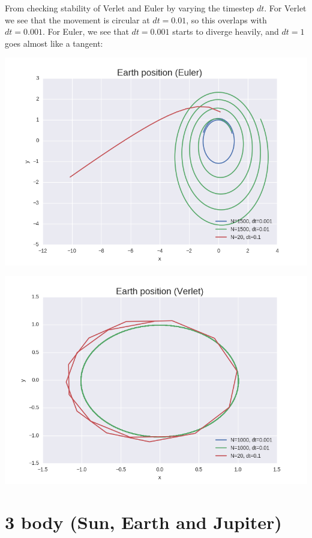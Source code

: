 \documentclass[11pt]{article}
\begin{document}
\begin{flushleft}
\begin{flushleft}
From checking stability of Verlet and Euler by varying the timestep $dt$. For Verlet we see that the movement is circular at $dt= 0.01$, so this overlaps with $dt=0.001$. For Euler, we see that $dt=0.001$ starts to diverge heavily, and $dt=1$ goes almost like a tangent:

\begin{center}
\includegraphics[scale=0.5]{Euler_stability_dt.png}
\end{center}

\begin{center}
\includegraphics[scale=0.5]{Verlet_stability_dt.png}
\end{center}
\end{flushleft}

\section{3 body (Sun, Earth and Jupiter)}


\end{flushleft}
\end{document}
